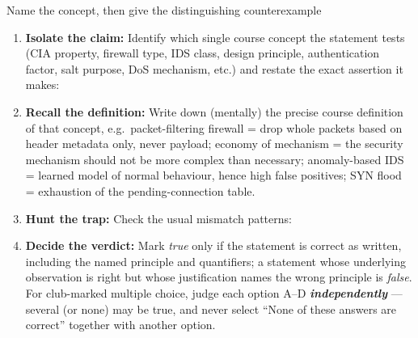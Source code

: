 \documentclass[12pt, a4paper]{article}
\newcommand{\term}[1]{\textbf{\textit{#1}}}        %
\begin{document}
\begin{schemebox}{Name the concept, then give the distinguishing counterexample}
\begin{enumerate}[label=\textbf{Step \arabic*:}, leftmargin=*]
    \item \textbf{Isolate the claim:} Identify which single course concept the statement tests (CIA property, firewall type, IDS class, design principle, authentication factor, salt purpose, DoS mechanism, etc.) and restate the exact assertion it makes:
    \item \textbf{Recall the definition:} Write down (mentally) the precise course definition of that concept, e.g.\ packet-filtering firewall = drop whole packets based on header metadata only, never payload; economy of mechanism = the security mechanism should not be more complex than necessary; anomaly-based IDS = learned model of normal behaviour, hence high false positives; SYN flood = exhaustion of the pending-connection table.
    \item \textbf{Hunt the trap:} Check the usual mismatch patterns:
    \item \textbf{Decide the verdict:} Mark \emph{true} only if the statement is correct as written, including the named principle and quantifiers; a statement whose underlying observation is right but whose justification names the wrong principle is \emph{false}. For club-marked multiple choice, judge each option A--D \term{independently} --- several (or none) may be true, and never select ``None of these answers are correct'' together with another option.

\end{enumerate}
\end{schemebox}
\end{document}

